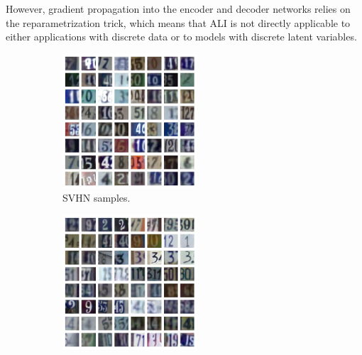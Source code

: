 \documentclass{article}
\newcommand{\figureHeight}{5cm}
\begin{document}
However, gradient propagation into the encoder and decoder networks relies on
the reparametrization trick, which means that ALI is not directly
applicable to either applications with discrete data or to models with
discrete latent variables.

\begin{figure}[p]
    \centering
    \begin{subfigure}[t]{0.49\textwidth}
        \centering
        \includegraphics[height=\figureHeight]{svhn_samples.png}
        \caption{\label{fig:svhn_samples} SVHN samples.}
    \end{subfigure}
    \hfill
    \begin{subfigure}[t]{0.49\textwidth}
        \centering
        \includegraphics[height=\figureHeight]{svhn_reconstructions.png}

\end{subfigure}
\end{figure}
\end{document}
